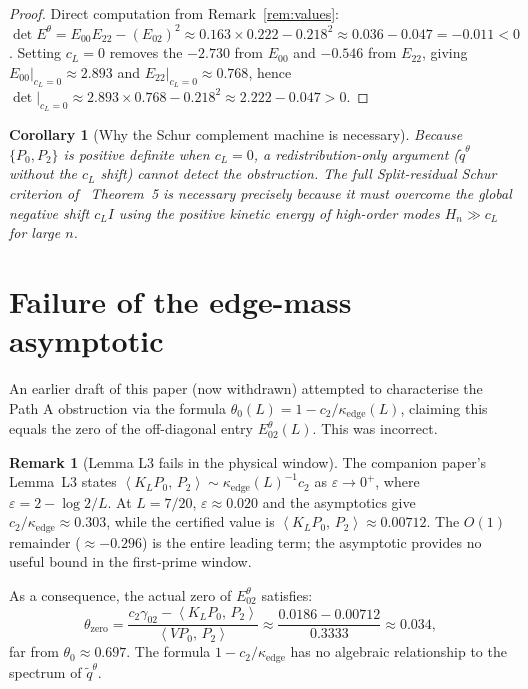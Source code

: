 \documentclass[12pt,a4paper]{amsart}
\theoremstyle{plain}
\newtheorem{corollary}[theorem]{Corollary}
\theoremstyle{definition}
\newtheorem{remark}[theorem]{Remark}
\newcommand{\ctwo}{c_2}
\newcommand{\kappae}{\kappa_{\mathrm{edge}}}
\newcommand{\ip}[2]{\left\langle #1,\,#2\right\rangle}
\begin{document}
\begin{proof}
Direct computation from Remark~\ref{rem:values}:
$\det E^\theta = E_{00}E_{22} - (E_{02})^2 \approx 0.163\times0.222 - 0.218^2
\approx 0.036 - 0.047 = -0.011 < 0$.
Setting $c_L = 0$ removes the $-2.730$ from $E_{00}$ and $-0.546$ from
$E_{22}$, giving $E_{00}|_{c_L=0} \approx 2.893$ and
$E_{22}|_{c_L=0} \approx 0.768$, hence
$\det|_{c_L=0} \approx 2.893\times0.768 - 0.218^2 \approx 2.222 - 0.047 > 0$.
\end{proof}

\begin{corollary}[Why the Schur complement machine is necessary]
Because $\{P_0, P_2\}$ is positive definite when $c_L = 0$, a
redistribution-only argument ($\tilde{q}^\theta$ without the $c_L$
shift) cannot detect the obstruction.
The full Split-residual Schur criterion of~\cite{WFP2026} Theorem~5
is necessary precisely because it must overcome the global negative
shift $c_L I$ using the positive kinetic energy of high-order modes
$H_n \gg c_L$ for large $n$.
\end{corollary}

\section{Failure of the edge-mass asymptotic}

An earlier draft of this paper (now withdrawn) attempted to characterise
the Path A obstruction via the formula
$\theta_0(L) = 1 - \ctwo/\kappae(L)$, claiming this equals the zero of
the off-diagonal entry $E_{02}^\theta(L)$.  This was incorrect.

\begin{remark}[Lemma L3 fails in the physical window]
\label{rem:lemmaL3}
The companion paper's Lemma~L3 states
$\ip{K_LP_0}{P_2} \sim \kappae(L)^{-1}\ctwo$ as $\varepsilon\to0^+$,
where $\varepsilon = 2 - \log2/L$.
At $L = 7/20$, $\varepsilon \approx 0.020$ and the asymptotics give
$\ctwo/\kappae \approx 0.303$, while the certified value is
$\ip{K_LP_0}{P_2} \approx 0.00712$.
The $O(1)$ remainder ($\approx -0.296$) is the entire leading term;
the asymptotic provides no useful bound in the first-prime window.

As a consequence, the actual zero of $E_{02}^\theta$ satisfies:
\[
  \theta_{\mathrm{zero}} = \frac{c_2\gamma_{02} - \ip{K_LP_0}{P_2}}
                                  {\ip{VP_0}{P_2}}
  \approx \frac{0.0186 - 0.00712}{0.3333}
  \approx 0.034,
\]
far from $\theta_0 \approx 0.697$.
The formula $1-\ctwo/\kappae$ has no algebraic relationship to the
spectrum of $\tilde{q}^\theta$.
\end{remark}
\end{document}
